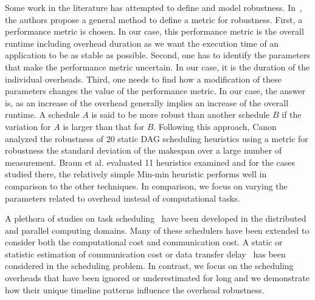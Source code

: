 \documentclass[final]{IEEEtran}
\begin{document}
Some work in the literature has attempted to define and model robustness. In~\cite{Ali2004}, the authors propose a general method to define a metric for robustness. First, a performance metric is chosen. In our case, this performance metric is the overall runtime including overhead duration as we want the execution time of an application to be as stable as possible. Second, one has to identify the parameters that make the performance metric uncertain. In our case, it is the duration of the individual overheads. Third, one needs to find how a modification of these parameters changes the value of the performance metric. In our case, the answer is, as an increase of the overhead generally implies an increase of the overall runtime. 
A schedule $A$ is said to be more robust than another schedule $B$ if the variation for $A$ is larger than that for $B$.
Following this approach, Canon~\cite{Canon2008} analyzed the robustness of 20 static DAG scheduling heuristics using a metric for robustness the standard deviation of the makespan over a large number of measurement. Braun et al. \cite{Braun2001} evaluated 11 heuristics examined and for the cases studied there, the relatively simple Min-min heuristic performs well in comparison to the other techniques. In comparison, we focus on varying the parameters related to overhead instead of computational tasks. 

A plethora of studies on task scheduling~\cite{Chetto1990, Dong2010, Yang03, Blythe2005} have been developed in the distributed and parallel computing domains. Many of these schedulers have been extended to consider both the computational cost and communication cost. A static or statistic estimation of communication cost or data transfer delay~\cite{Dong2010, Yang03} has been considered in the scheduling problem. In contrast, we focus on the scheduling overheads that have been ignored or underestimated for long and we demonstrate how their unique timeline patterns influence the overhead robustness. 
\end{document}
